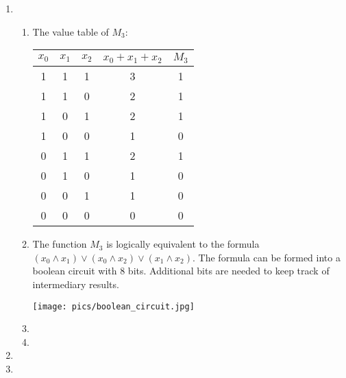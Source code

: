 \documentclass[11pt,a4paper]{article}
\begin{document}
\begin{enumerate}
    \item
          \begin{enumerate}
              \item The value table of $M_3$:
                    \begin{center}
                        \begin{tabular}{c|c|c|c|c}
                            $x_0$ & $x_1$ & $x_2$ & $x_0 + x_1 + x_2$ & $M_3$ \\
                            \hline
                            1     & 1     & 1     & 3                 & 1     \\
                            1     & 1     & 0     & 2                 & 1     \\
                            1     & 0     & 1     & 2                 & 1     \\
                            1     & 0     & 0     & 1                 & 0     \\
                            0     & 1     & 1     & 2                 & 1     \\
                            0     & 1     & 0     & 1                 & 0     \\
                            0     & 0     & 1     & 1                 & 0     \\
                            0     & 0     & 0     & 0                 & 0     \\
                        \end{tabular}
                    \end{center}
              \item The function $M_3$ is logically equivalent to the formula $(x_0 \land x_1) \lor (x_0 \land x_2) \lor (x_1 \land x_2)$. The formula can be formed into a boolean circuit
                    with 8 bits. Additional bits are needed to keep track of intermediary results.
                    \begin{center}
                        \texttt{[image: pics/boolean\_circuit.jpg]}
                    \end{center}
              \item
              \item
          \end{enumerate}
          \newpage

    \item

          \newpage

    \item

          \newpage
\end{enumerate}
\end{document}
